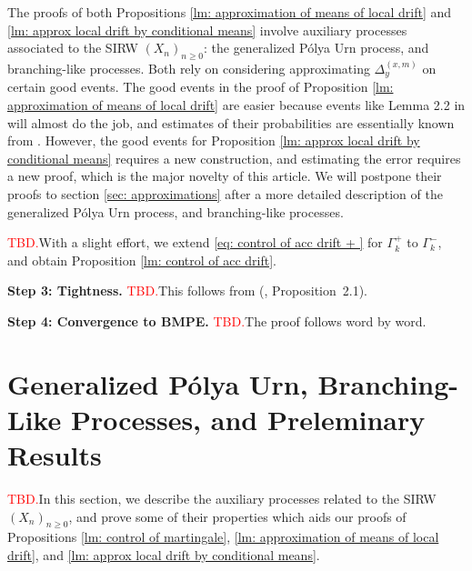 \documentclass[twoside,12pt,a4paper]{article}
\numberwithin{equation}{section}
\newcommand\TBD{\textcolor{red}{TBD.}}
\begin{document}
The proofs of both Propositions \ref{lm: approximation of means of local drift} and \ref{lm: approx local drift by conditional means} involve auxiliary processes associated to the SIRW $(X_n)_{n\geq 0}$: the generalized P\'{o}lya Urn process, and branching-like processes. Both rely on considering approximating $\Delta_{y}^{(x,m)}$ on certain good events. The good events in the proof of Proposition \ref{lm: approximation of means of local drift} are easier because events like Lemma 2.2 in \cite{KMP22} will almost do the job, and estimates of their probabilities are essentially known from \cite{KMP22}. However, the good events for Proposition \ref{lm: approx local drift by conditional means} requires a new construction, and estimating the error requires a new proof, which is the major novelty of this article. We will postpone their proofs to section \ref{sec: approximations} after a more detailed description of the generalized P\'{o}lya Urn process, and branching-like processes.

\TBD With a slight effort, we extend \eqref{eq: control of acc drift + } for $\Gamma_k^+$ to $\Gamma_k^-$, and obtain Proposition \ref{lm: control of acc drift}.


\textbf{Step 3: Tightness.} \TBD This follows from (\cite{KMP22}, Proposition~2.1).

\textbf{Step 4: Convergence to BMPE.} \TBD The proof follows word by word.

\section{Generalized P\'{o}lya Urn, Branching-Like Processes, and Preleminary Results}\label{sec: generalized Polya Urn, BLP}
\TBD In this section, we describe the auxiliary processes related to the SIRW $(X_n)_{n\geq 0}$, and prove some of their properties which aids our proofs of Propositions \ref{lm: control of martingale}, \ref{lm: approximation of means of local drift}, and \ref{lm: approx local drift by conditional means}.
\end{document}
